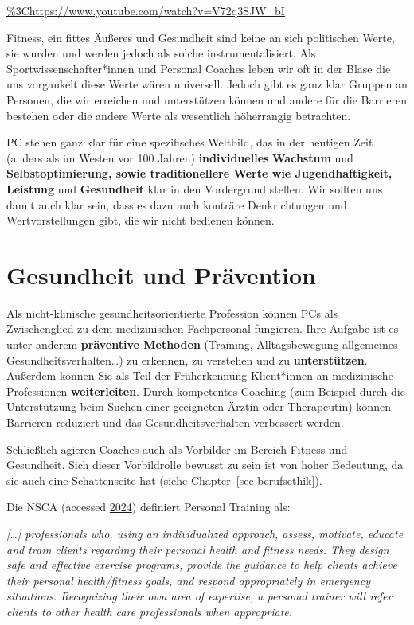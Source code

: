 \documentclass[
  letterpaper,
  DIV=11,
  numbers=noendperiod]{scrreprt}
\begin{document}
\url{\%3Chttps://www.youtube.com/watch?v=V72q3SJW_bI}

Fitness, ein fittes Äußeres und Gesundheit sind keine an sich
politischen Werte, sie wurden und werden jedoch als solche
instrumentalisiert. Als Sportwissenschafter*innen und Personal Coaches
leben wir oft in der Blase die uns vorgaukelt diese Werte wären
universell. Jedoch gibt es ganz klar Gruppen an Personen, die wir
erreichen und unterstützen können und andere für die Barrieren bestehen
oder die andere Werte als wesentlich höherrangig betrachten.

PC stehen ganz klar für eine spezifisches Weltbild, das in der heutigen
Zeit (anders als im Westen vor 100 Jahren) \textbf{individuelles}
\textbf{Wachstum} und \textbf{Selbstoptimierung, sowie traditionellere
Werte wie Jugendhaftigkeit, Leistung} und \textbf{Gesundheit} klar in
den Vordergrund stellen. Wir sollten uns damit auch klar sein, dass es
dazu auch konträre Denkrichtungen und Wertvorstellungen gibt, die wir
nicht bedienen können.

\section{Gesundheit und Prävention}\label{gesundheit-und-pruxe4vention}

Als nicht-klinische gesundheitsorientierte Profession können PCs als
Zwischenglied zu dem medizinischen Fachpersonal fungieren. Ihre Aufgabe
ist es unter anderem \textbf{präventive Methoden} (Training,
Alltagsbewegung allgemeines Gesundheitsverhalten\ldots) zu erkennen, zu
verstehen und zu \textbf{unterstützen}. Außerdem können Sie als Teil der
Früherkennung Klient*innen an medizinische Professionen
\textbf{weiterleiten}. Durch kompetentes Coaching (zum Beispiel durch
die Unterstützung beim Suchen einer geeigneten Ärztin oder Therapeutin)
können Barrieren reduziert und das Gesundheitsverhalten verbessert
werden.

Schließlich agieren Coaches auch als Vorbilder im Bereich Fitness und
Gesundheit. Sich dieser Vorbildrolle bewusst zu sein ist von hoher
Bedeutung, da sie auch eine Schattenseite hat (siehe
Chapter~\ref{sec-berufsethik}).

Die NSCA (accessed
\href{https://www.nsca.com/certification/csps/}{2024}) definiert
Personal Training als:

\emph{{[}\ldots{]} professionals who, using an individualized approach,
assess, motivate, educate and train clients regarding their personal
health and fitness needs. They design safe and effective exercise
programs, provide the guidance to help clients achieve their personal
health/fitness goals, and respond appropriately in emergency situations.
Recognizing their own area of expertise, a personal trainer will refer
clients to other health care professionals when appropriate.}
\end{document}
